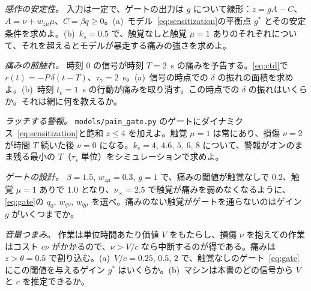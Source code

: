 \begin{exercise}[\lvlB]
\label{ex:14:3}
\emph{感作の安定性。} 入力は一定で、ゲートの出力は $g$ について線形：$z=gA-C$、$A=\nu+w_{z\mu}\mu$、$C=\beta q\ge0$。(a)~モデル~\eqref{eq:sensitization}の平衡点 $g^*$ とその安定条件を求めよ。(b)~$k_s=0.5$ で、触覚なしと触覚 $\mu=1$ ありのそれぞれについて、それを超えるとモデルが暴走する痛みの強さを求めよ。
\end{exercise}

\begin{exercise}[\lvlA]
\label{ex:14:4}
\emph{痛みの前触れ。} 時刻 $0$ の信号が時刻 $T=2$~s の痛みを予告する。\eqref{eq:ctd}で $r(t)=-P\,\delta(t-T)$、$\tau_\gamma=2$~s。(a)~信号の時点での $\delta$ の振れの面積を求めよ。(b)~時刻 $t_e=1$~s の行動が痛みを取り消す。この時点での $\delta$ の振れはいくらか。それは網に何を教えるか。
\end{exercise}

\begin{exercise}[\lvlB]
\label{ex:14:5}
\emph{ラッチする警報。} \texttt{models/\allowbreak pain\_gate.py} のゲートにダイナミクス~\eqref{eq:sensitization}と飽和 $z\le4$ を加えよ。触覚 $\mu=1$ は常にあり、損傷 $\nu=2$ が時間 $T$ 続いた後 $\nu=0$ になる。$k_s=4$, $4.6$, $5$, $6$, $8$ について、警報がオンのまま残る最小の $T$（$\tau_s$ 単位）をシミュレーションで求めよ。
\end{exercise}

\begin{exercise}[\lvlB]
\label{ex:14:6}
\emph{ゲートの設計。} $\beta=1.5$, $w_{z\mu}=0.3$, $g=1$ で、痛みの閾値が触覚なしで $0.2$、触覚 $\mu=1$ ありで $1.0$ となり、$\nu_\times=2.5$ で触覚が痛みを弱めなくなるように、\eqref{eq:gate}の $q_0$, $w_{q\nu}$, $w_{q\mu}$ を選べ。痛みのない触覚がゲートを通らないのはゲイン $g$ がいくつまでか。
\end{exercise}

\begin{exercise}[\lvlC]
\label{ex:14:7}
\emph{音量つまみ。} 作業は単位時間あたり価値 $V$ をもたらし、損傷 $\nu$ を抱えての作業はコスト $c\nu$ がかかるので、$\nu>V/c$ なら中断するのが得である。痛みは $z>\theta=0.5$ で割り込む。(a)~$V/c=0.25$, $0.5$, $2$ で、触覚なしのゲート~\eqref{eq:gate}にこの閾値を与えるゲイン $g^*$ はいくらか。(b)~マシンは本書のどの信号から $V$ と $c$ を推定できるか。
\end{exercise}
